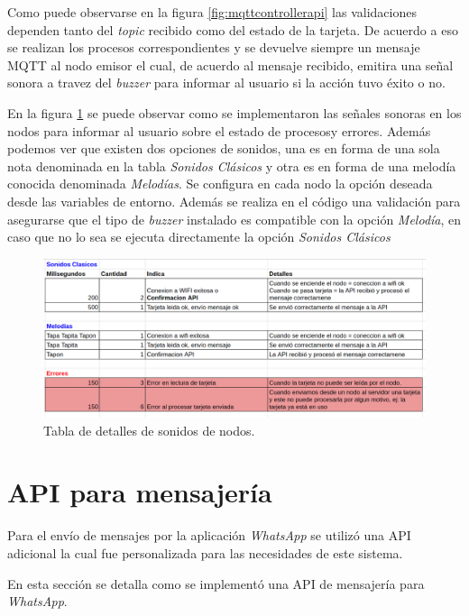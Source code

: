 Como puede observarse en la figura \ref{fig:mqttcontrollerapi} las validaciones dependen tanto del \textit{topic} recibido como del estado de la tarjeta. De acuerdo a eso se realizan los procesos correspondientes y se devuelve siempre un mensaje MQTT al nodo emisor el cual, de acuerdo al mensaje recibido, emitira una señal sonora a travez del \textit{buzzer} para informar al usuario si la acción tuvo éxito o no.

En la figura \ref{fig:mqttsonidosnodos} se puede observar como se implementaron las señales sonoras en los nodos para informar al usuario sobre el estado de procesosy errores. Además podemos ver que existen dos opciones de sonidos, una es en forma de una sola nota denominada en la tabla \textit{Sonidos Clásicos} y otra es en forma de una melodía conocida denominada \textit{Melodías}. Se configura en cada nodo la opción deseada desde las variables de entorno. Además se realiza en el código una validación para asegurarse que el tipo de \textit{buzzer} instalado es compatible con la opción \textit{Melodía}, en caso que no lo sea se ejecuta directamente la opción \textit{Sonidos Clásicos}

\begin{figure}[ht]
	\centering
	\includegraphics[scale=.40]{./Figures/mqtt-sonidos-nodos.png}
	\caption{Tabla de detalles de sonidos de nodos.}
	\label{fig:mqttsonidosnodos}
\end{figure}


\section{API para mensajería}
\label{sec:apimessenger}

Para el envío de mensajes por la aplicación \textit{WhatsApp} \cite{whatsapp} se utilizó una API adicional \cite{api-whatsapp-ts} la cual fue personalizada para las necesidades de este sistema.

En esta sección se detalla como se implementó una API de mensajería para \textit{WhatsApp}.

